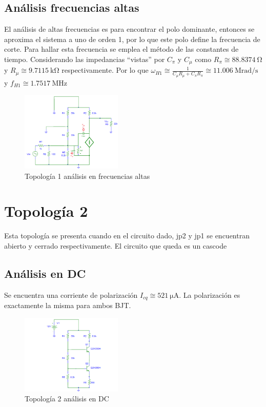 \documentclass[letterpaper, 10 pt, conference]{ieeeconf}  %
\begin{document}
\subsection{Análisis frecuencias altas}
El análisis de altas frecuencias es para encontrar el polo dominante, entonces se aproxima el sistema a uno de orden 1, por lo que este polo define la frecuencia de corte. Para hallar esta frecuencia se emplea el método de las constantes de tiempo. Considerando las impedancias ``vistas'' por $C_{\pi}$ y $C_{\mu}$ como $R_{\pi} \cong \qty{88.8374}{\ohm}$ y $R_{\mu} \cong \qty{9.7115}{\kilo\ohm}$ respectivamente. Por lo que $\omega_{H1} \cong \frac{1}{ C_{\mu}R_{\mu} + C_{\pi}R_{\pi} } \cong \qty{11.006}{\mega\radian\per\second}$ y $f_{H1} \cong \qty{1.7517}{\mega\hertz}$

\begin{figure}[H]
 \centering
 \includegraphics[width=0.43\textwidth]{./Imagenes/topologia1_fa.png}
 \caption{Topología 1 análisis en frecuencias altas}
\end{figure}

\section{Topología 2}
Esta topología se presenta cuando en el circuito dado, jp2 y jp1 se encuentran abierto y cerrado respectivamente. El circuito que queda es un cascode
\subsection{Análisis en DC}
Se encuentra una corriente de polarización $I_{cq} \cong \qty{521}{\micro\ampere}$. La polarización es exactamente la misma para ambos BJT.

\begin{figure}[H]
 \centering
 \includegraphics[width=0.43\textwidth]{./Imagenes/topologia2_dc.png}
 \caption{Topología 2 análisis en DC}
\end{figure}
\end{document}
